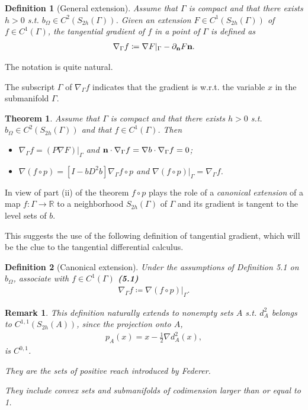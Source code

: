 \documentclass[oneside]{book}
\numberwithin{equation}{section}
\newtheorem{definition}{Definition}[section]
\newtheorem{theorem}{Theorem}[section]
\newtheorem{remark}{Remark}[section]
\begin{document}
\begin{definition}[General extension]
    Assume that $\Gamma$ is compact and that there exists $h > 0$ s.t. $b_\Omega\in C^2(S_{2h}(\Gamma))$. Given an extension $F\in C^1(S_{2h}(\Gamma))$ of $f\in C^1(\Gamma)$, the \emph{tangential gradient} of $f$ in a point of $\Gamma$ is defined as
    \begin{align*}
        \nabla_\Gamma f\coloneqq\nabla F|_\Gamma - \partial_{\bf n}F{\bf n}.
    \end{align*}
\end{definition}
The notation is quite natural.

The subscript $\Gamma$ of $\nabla_\Gamma f$ indicates that the gradient is w.r.t. the variable $x$ in the submanifold $\Gamma$.

\begin{theorem}
    Assume that $\Gamma$ is compact and that there exists $h > 0$ s.t. $b_\Omega\in C^2(S_{2h}(\Gamma))$ and that $f\in C^1(\Gamma)$. Then
    \begin{itemize}
        \item[(i)] $\nabla_\Gamma f = (P\nabla F)|_\Gamma$ and ${\bf n}\cdot\nabla_\Gamma f = \nabla b\cdot\nabla_\Gamma f = 0$;
        \item[(ii)] $\nabla(f\circ p) = [I - bD^2b]\nabla_\Gamma f\circ p$ and $\nabla(f\circ p)|_\Gamma = \nabla_\Gamma f$.
    \end{itemize}
\end{theorem}

In view of part (ii) of the theorem $f\circ p$ plays the role of a \textit{canonical extension} of a map $f:\Gamma\to\mathbb{R}$ to a neighborhood $S_{2h}(\Gamma)$ of $\Gamma$ and its gradient is tangent to the level sets of $b$.

This suggests the use of the following definition of tangential gradient, which will be the clue to the tangential differential calculus.

\begin{definition}[Canonical extension]
    Under the assumptions of Definition 5.1 on $b_\Omega$, associate with $f\in C^1(\Gamma)$ \textbf{(5.1)}
    \begin{align*}
        \nabla_\Gamma f\coloneqq\nabla(f\circ p)|_\Gamma.
    \end{align*}
\end{definition}

\begin{remark}
    This definition naturally extends to nonempty sets $A$ s.t. $d_A^2$ belongs to $C^{1,1}(S_{2h}(A))$, since the projection onto $A$,
    \begin{align*}
        p_A(x) = x - \frac{1}{2}\nabla d_A^2(x),
    \end{align*}
    is $C^{0,1}$.
    
    They are the sets of positive reach introduced by Federer.
    
    They include convex sets and submanifolds of codimension larger than or equal to 1.
\end{remark}
\end{document}
